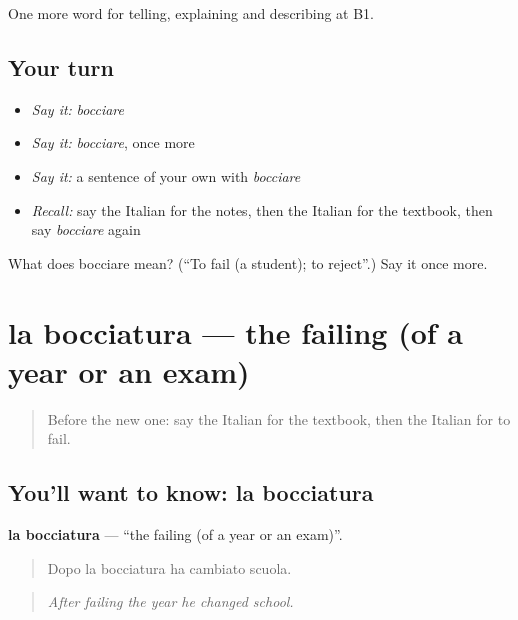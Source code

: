 \begin{grammarlens}[title={What you've built}]
One more word for telling, explaining and describing at B1.
\end{grammarlens}

\subsection*{Your turn}
\begin{itemize}
\raggedright
  \item \emph{Say it:} \emph{bocciare}
  \item \emph{Say it:} \emph{bocciare}, once more
  \item \emph{Say it:} a sentence of your own with \emph{bocciare}
  \item \emph{Recall:} say the Italian for the notes, then the Italian for the textbook, then say \emph{bocciare} again
\end{itemize}

\begin{tcolorbox}[breakable,colback=teal!4,colframe=teal!35!black,title={Before you move on}]
What does bocciare mean? (\textquotedblleft{}To fail (a student); to reject\textquotedblright{}.) Say it once more.
\end{tcolorbox}
\section[la bocciatura]{la bocciatura — the failing (of a year or an exam)}

\label{lesson:IT-C383-bocciatura}



\begin{quote}
Before the new one: say the Italian for the textbook, then the Italian for to fail.
\end{quote}

\subsection*{You'll want to know: la bocciatura}
\textbf{la bocciatura} — \textquotedblleft{}the failing (of a year or an exam)\textquotedblright{}.

\begin{quote}
Dopo la bocciatura ha cambiato scuola.
\end{quote}

\begin{quote}
\emph{After failing the year he changed school.}
\end{quote}

